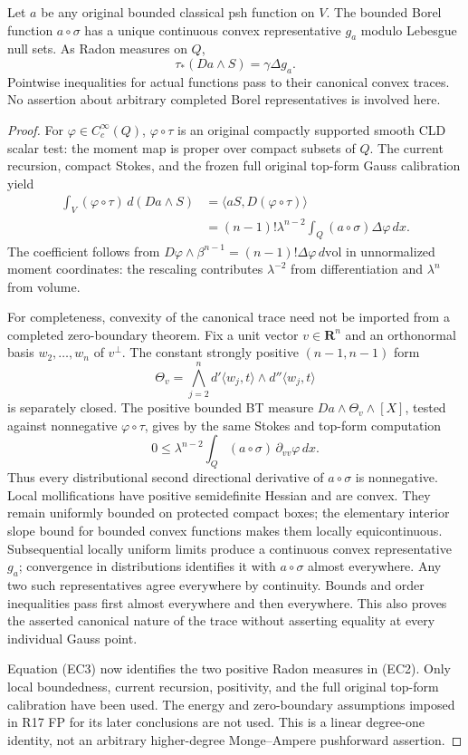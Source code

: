 \begin{lemma}
Let $a$ be any original bounded classical psh function on $V$. The bounded
Borel function $a\circ\sigma$ has a unique continuous convex representative
$g_a$ modulo Lebesgue null sets. As Radon measures on $Q$,
\[
 \tau_*(Da\wedge S)=\gamma\Delta g_a.
 \tag{EC2}
\]
Pointwise inequalities for actual functions pass to their canonical
convex traces. No assertion about arbitrary completed Borel representatives
is involved here.
\end{lemma}
\begin{proof}
For $\varphi\in C_c^\infty(Q)$, $\varphi\circ\tau$ is an original compactly
supported smooth CLD scalar test: the moment map is proper over compact
subsets of $Q$. The current recursion, compact Stokes, and the frozen full
original top-form Gauss calibration yield
\[
 \begin{split}
 \int_V(\varphi\circ\tau)\,d(Da\wedge S)
 &=\langle aS,D(\varphi\circ\tau)\rangle\\
 &=(n-1)!\lambda^{n-2}\int_Q(a\circ\sigma)\Delta\varphi\,dx.
 \end{split}
 \tag{EC3}
\]
The coefficient follows from
$D\varphi\wedge\beta^{n-1}=(n-1)!\Delta\varphi\,d\mathrm{vol}$
in unnormalized moment coordinates: the rescaling contributes
$\lambda^{-2}$ from differentiation and $\lambda^n$ from volume.

For completeness, convexity of the canonical trace need not be imported
from a completed zero-boundary theorem. Fix a unit vector $v\in\mathbf R^n$
and an orthonormal basis $w_2,\ldots,w_n$ of $v^\perp$. The constant
strongly positive $(n-1,n-1)$ form
\[
 \Theta_v=\bigwedge_{j=2}^n
 d'\langle w_j,t\rangle\wedge d''\langle w_j,t\rangle
\]
is separately closed. The positive bounded BT measure
$Da\wedge\Theta_v\wedge[X]$, tested against nonnegative
$\varphi\circ\tau$, gives by the same Stokes and top-form computation
\[
 0\le\lambda^{n-2}\int_Q(a\circ\sigma)\,\partial_{vv}\varphi\,dx.
\]
Thus every distributional second directional derivative of
$a\circ\sigma$ is nonnegative. Local mollifications have positive
semidefinite Hessian and are convex. They remain uniformly bounded on
protected compact boxes; the elementary interior slope bound for bounded
convex functions makes them locally equicontinuous. Subsequential locally
uniform limits produce a continuous convex representative $g_a$; convergence
in distributions identifies it with $a\circ\sigma$ almost everywhere.
Any two such representatives agree everywhere by continuity. Bounds and
order inequalities pass first almost everywhere and then everywhere.
This also proves the asserted canonical nature of the trace without
asserting equality at every individual Gauss point.

Equation (EC3) now identifies the two positive Radon measures in (EC2).
Only local boundedness, current recursion, positivity, and the full
original top-form calibration have been used. The energy and zero-boundary
assumptions imposed in R17 FP for its later conclusions are not used.
This is a linear degree-one identity, not an arbitrary higher-degree
Monge--Ampere pushforward assertion.
\end{proof}

